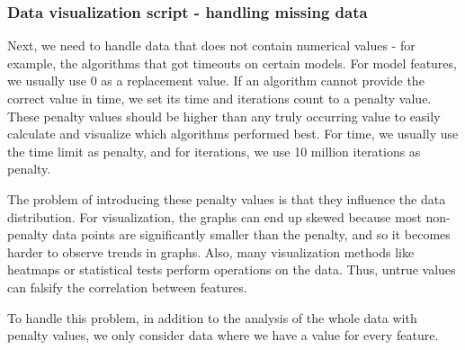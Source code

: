 \subsubsection{Data visualization script - handling missing data}
Next, we need to handle data that does not contain numerical values - for example, the algorithms that got timeouts on certain models.
For model features, we usually use 0 as a replacement value. 
If an algorithm cannot provide the correct value in time, we set its time and iterations count to a penalty value.
These penalty values should be higher than any truly occurring value to easily calculate and visualize which algorithms performed best.
For time, we usually use the time limit as penalty, and for iterations, we use 10 million iterations as penalty.

The problem of introducing these penalty values is that they influence the data distribution.
For visualization, the graphs can end up skewed because most non-penalty data points are significantly smaller than the penalty, 
and so it becomes harder to observe trends in graphs. Also, many visualization methods like heatmaps or statistical tests perform operations on the
data. Thus, untrue values can falsify the correlation between features.

To handle this problem, in addition to the analysis of the whole data with penalty values, we only consider data where we have a value for every feature.